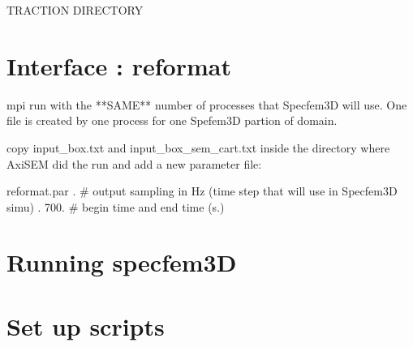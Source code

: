 \documentclass[a4paper,11pt]{article}
\begin{document}
TRACTION DIRECTORY \newline




\section{Interface : reformat}

mpi run with the **SAME** number of processes that Specfem3D will use. One
file is created by one process for one Spefem3D partion of domain. \newline

copy input\_box.txt and input\_box\_sem\_cart.txt inside the directory where
AxiSEM did the run and add a new parameter file: \newline
 
reformat.par  .         \# output sampling in Hz (time step that will use in Specfem3D simu) . 700.   \# begin time and end time (s.) \newline


\section{Running specfem3D}


\section{Set up scripts}
\end{document}
